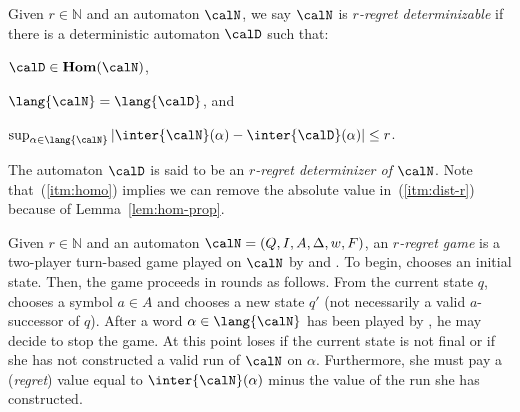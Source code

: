 \documentclass[a4paper]{article}
\begin{document}
Given $r \in
\mathbb{N}$ and an automaton $\calN$, we say $\calN$ is \emph{$r$-regret
determinizable} if there is a deterministic automaton $\calD$ such that:
\begin{inparaenum}[$(i)$]
\item\label{itm:homo} $\calD \in \mathbf{Hom}(\calN)$,
	\item\label{itm:same-lang} $\lang{\calN} = \lang{\calD}$, and
	\item\label{itm:dist-r} $\sup_{\alpha \in \lang{\calN}}
		\left|\inter{\calN}(\alpha) -
		\inter{\calD}(\alpha)\right| \le r$.
\end{inparaenum}
The automaton $\calD$ is said to be an \emph{$r$-regret determinizer of
$\calN$}.  Note that~(\ref{itm:homo}) implies we can remove the absolute
value in~(\ref{itm:dist-r}) because of Lemma~\ref{lem:hom-prop}.
%
%

Given $r \in \mathbb{N}$ and an automaton $\calN =
(Q,I,A,\Delta,w,F)$, an \emph{$r$-regret game} is a two-player turn-based game
played on $\calN$ by \eve and \adam. To begin, \eve chooses an initial state.
Then, the game proceeds in rounds as follows. From the current state $q$, \adam
chooses a symbol $a \in A$ and \eve chooses a new state $q'$ (not necessarily a
valid $a$-successor of $q$). After a word $\alpha \in \lang{\calN}$ has been
played by \adam, he may decide to stop the game. At this point \eve loses if the
current state is not final or if she has not constructed a valid run of $\calN$
on $\alpha$. Furthermore, she must pay a (\emph{regret}) value equal to
$\inter{\calN}(\alpha)$ minus the value of the run she has constructed.
\end{document}
